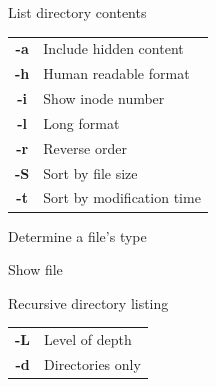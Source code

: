 \documentclass[12pt, a4paper]
{article}
\begin{document}
\begin{multicols}{3}
\begin{description}[nolistsep]
	\item[ls] List directory contents
	\item
	\begin{tabular}{cl}
		{\large \ttfamily \textbf{-a}} & Include hidden content \\
		{\large \ttfamily \textbf{-h}} & Human readable format\\
		{\large \ttfamily \textbf{-i}} & Show inode number\\
		{\large \ttfamily \textbf{-l}} & Long format \\
		{\large \ttfamily \textbf{-r}} & Reverse order \\
		{\large \ttfamily \textbf{-S}} & Sort by file size \\
		{\large \ttfamily \textbf{-t}} & Sort by modification time\\
	\end{tabular}
	\item[file] Determine a file's type
	\item[less] Show file
	\item[tree] Recursive  directory listing
	\item
	\begin{tabular}{cl}
		{\large \ttfamily \textbf{-L}} & Level of depth \\
		{\large \ttfamily \textbf{-d}} & Directories only\\
	\end{tabular}
\end{description}





\end{multicols}
\end{document}
